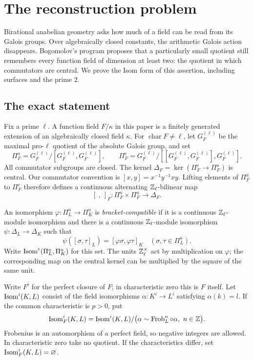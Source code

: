 \section{The reconstruction problem}
\label{sec:introduction}

Birational anabelian geometry asks how much of a field can be read from its
Galois groups.  Over algebraically closed constants, the arithmetic Galois
action disappears.  Bogomolov's program proposes that a particularly small
quotient still remembers every function field of dimension at least two:
the quotient in which commutators are central.  We prove the Isom form of
this assertion, including surfaces and the prime $2$.

\subsection{The exact statement}
Fix a prime $\ell$.  A function field $F/\kappa$ in this paper is a finitely
generated extension of an algebraically closed field $\kappa$.
For $\operatorname{char}F\ne\ell$, let $G_F^{(\ell)}$ be the maximal
pro-$\ell$ quotient of the absolute Galois group, and set
\[
 \Pi_F^a=G_F^{(\ell)}/[G_F^{(\ell)},G_F^{(\ell)}],\qquad
 \Pi_F^c=G_F^{(\ell)}/[[G_F^{(\ell)},G_F^{(\ell)}],G_F^{(\ell)}].
\]
All commutator subgroups are closed.  The kernel
$\Delta_F=\ker(\Pi_F^c\to\Pi_F^a)$ is central.  Our commutator convention is
$[x,y]=x^{-1}y^{-1}xy$.  Lifting elements of $\Pi_F^a$ to $\Pi_F^c$ therefore
defines a continuous alternating $\mathbb Z_\ell$-bilinear map
\[
 [\ ,\ ]_F:\Pi_F^a\times\Pi_F^a\longrightarrow\Delta_F.
\]

An isomorphism $\varphi:\Pi_L^a\to\Pi_K^a$ is
\emph{bracket-compatible} if it is a continuous $\mathbb Z_\ell$-module isomorphism
and there is a continuous $\mathbb Z_\ell$-module isomorphism
$\psi:\Delta_L\to\Delta_K$ such that
\[
 \psi([\sigma,\tau]_L)=[\varphi\sigma,\varphi\tau]_K
 \quad(\sigma,\tau\in\Pi_L^a).
\]
Write $\operatorname{Isom}^c(\Pi_L^a,\Pi_K^a)$ for this set.  The units $\mathbb Z_\ell^\times$
act by multiplication on $\varphi$; the corresponding map on the central
kernel can be multiplied by the square of the same unit.

Write $F^i$ for the perfect closure of $F$; in characteristic zero this is
$F$ itself.  Let $\operatorname{Isom}^i(K,L)$ consist of the field isomorphisms
$\alpha:K^i\to L^i$ satisfying $\alpha(k)=l$.
If the common characteristic is $p>0$, put
\[
 \operatorname{Isom}_F^i(K,L)=\operatorname{Isom}^i(K,L)/
 \bigl(\alpha\sim\operatorname{Frob}_L^n\circ\alpha,\ n\in\mathbb Z\bigr).
\]
Frobenius is an automorphism of a perfect field, so negative integers are
allowed.  In characteristic zero take no quotient.  If the
characteristics differ, set $\operatorname{Isom}_F^i(K,L)=\varnothing$.

